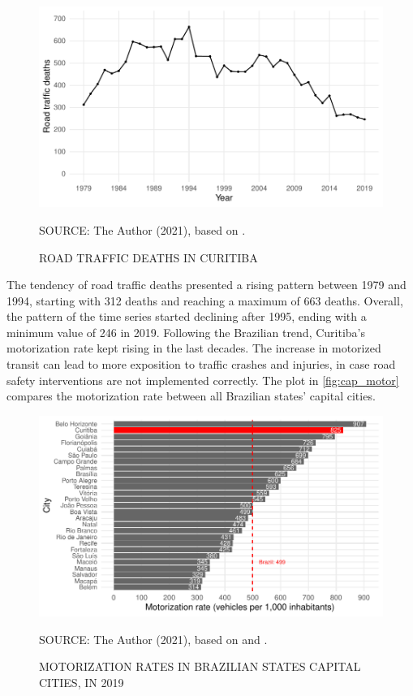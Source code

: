 \begin{figure}[!htbp]
    \centering\footnotesize
    \captionsetup{font=footnotesize}
    \caption{ROAD TRAFFIC DEATHS IN CURITIBA}
    \includegraphics{fig/cwb_abs.pdf}
    \label{fig:cwb_abs}
    \par SOURCE: The Author (2021), based on \textcite{MinistryofHealth2020}.
\end{figure}  

The tendency of road traffic deaths presented a rising pattern between 1979 and 1994, starting with 312 deaths and reaching a maximum of 663 deaths. Overall, the pattern of the time series started declining after 1995, ending with a minimum value of 246 in 2019. Following the Brazilian trend, Curitiba's motorization rate kept rising in the last decades. The increase in motorized transit can lead to more exposition to traffic crashes and injuries, in case road safety interventions are not implemented correctly. The plot in \autoref{fig:cap_motor} compares the motorization rate between all Brazilian states' capital cities.    

\begin{figure}[!htbp]
    \centering\footnotesize
    \captionsetup{font=footnotesize}
    \caption{MOTORIZATION RATES IN BRAZILIAN STATES CAPITAL CITIES, IN 2019}
    \includegraphics{fig/cap_motor.pdf}
    \label{fig:cap_motor}
    \par SOURCE: The Author (2021), based on \textcite{MinistryofHealth2021} and \textcite{DENATRAN2020}.
\end{figure}   

